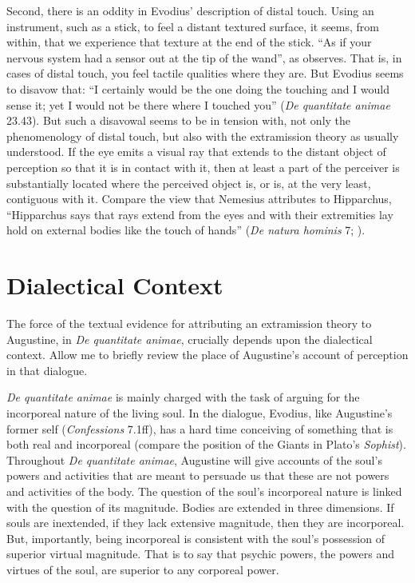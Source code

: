 \documentclass[12pt]{article}
\begin{document}
Second, there is an oddity in Evodius' description of distal touch. Using an instrument, such as a stick, to feel a distant textured surface, it seems, from within, that we experience that texture at the end of the stick. ``As if your nervous system had a sensor out at the tip of the wand'', as \citet[47]{Dennett:1993ce} observes. That is, in cases of distal touch, you feel tactile qualities where they are. But Evodius seems to disavow that: ``I certainly would be the one doing the touching and I would sense it; yet I would not be there where I touched you'' (\emph{De quantitate animae} 23.43). But such a disavowal seems to be in tension with, not only the phenomenology of distal touch, but also with the extramission theory as usually understood. If the eye emits a visual ray that extends to the distant object of perception so that it is in contact with it, then at least a part of the perceiver is substantially located where the perceived object is, or is, at the very least, contiguous with it. Compare the view that Nemesius attributes to Hipparchus, ``Hipparchus says that rays extend from the eyes and with their extremities lay hold on external bodies like the touch of hands'' (\emph{De natura hominis} 7; \citealt[104]{Sharples:2008aa}).
 

\section{Dialectical Context} %
\label{sec:dialectical_context}

The force of the textual evidence for attributing an extramission theory to Augustine, in \emph{De quantitate animae}, crucially depends upon the dialectical context. Allow me to briefly review the place of Augustine's account of perception in that dialogue.

\emph{De quantitate animae}  is mainly charged with the task of arguing for the incorporeal nature of the living soul. In the dialogue, Evodius, like Augustine’s former self (\emph{Confessions} 7.1ff), has a hard time conceiving of something that is both real and incorporeal (compare the position of the Giants in Plato's \emph{Sophist}). Throughout \emph{De quantitate animae}, Augustine will give accounts of the soul’s powers and activities that are meant to persuade us that these are not powers and activities of the body. The question of the soul’s incorporeal nature is linked with the question of its magnitude. Bodies are extended in three dimensions. If souls are inextended, if they lack extensive magnitude, then they are incorporeal. But, importantly, being incorporeal is consistent with the soul’s possession of superior virtual magnitude. That is to say that psychic powers, the powers and virtues of the soul, are superior to any corporeal power. 
\end{document}
